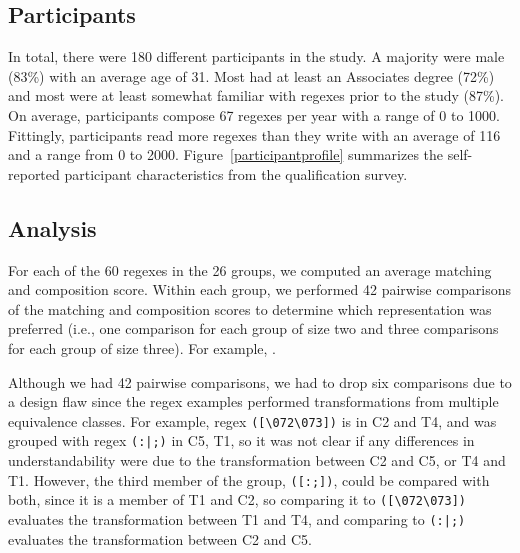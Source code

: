 \subsection{Participants}

In total, there were 180 different participants in the study.
A majority were male (83\%) with an average age of 31. Most had
at least an Associates degree (72\%) and most were at least somewhat familiar with regexes prior to the study (87\%). On average,
participants compose 67 regexes per year with a range of 0 to 1000. Fittingly, participants read more regexes than they write with an average of 116 and a range from 0 to 2000. Figure~\ref{participantprofile} summarizes the self-reported participant characteristics from the qualification survey.




\subsection{Analysis}
For each of the 60 regexes in the 26 groups, we computed an average matching and composition score. Within each group, we performed 42 pairwise comparisons of the matching and composition scores to determine which representation was preferred (i.e., one comparison for each group of size two and three comparisons for each group of size three).
For example, .

%
%
%
%
%


Although we had 42 pairwise comparisons,  we had to drop six comparisons  due to a design flaw since the regex examples performed transformations from multiple equivalence classes. For example, regex \verb!([\072\073])! is in C2 and T4, and was grouped with regex \verb!(:|;)! in C5, T1, so it was not clear if any differences in understandability were due to the transformation between C2 and C5, or T4 and T1. However, the third member of the group, \verb!([:;])!, could be compared with both, since it is a member of T1 and C2, so comparing it to \verb!([\072\073])! evaluates the transformation between T1 and T4, and comparing to \verb!(:|;)! evaluates the transformation between C2 and C5.


